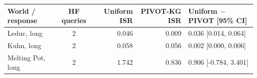 \begin{tabular*}{\linewidth}{@{\extracolsep{\fill}}lcrrl@{}}
\toprule
World / response & HF queries & Uniform ISR & PIVOT-KG ISR & \shortstack[l]{Uniform $-$ PIVOT\\{[95\% CI]}} \\
\midrule
Leduc, long & 2 & 0.046 & 0.009 & 0.036 [0.014, 0.064] \\
Kuhn, long & 2 & 0.058 & 0.056 & 0.002 [0.000, 0.006] \\
Melting Pot, long & 2 & 1.742 & 0.836 & 0.906 [-0.784, 3.401] \\
\bottomrule
\end{tabular*}

